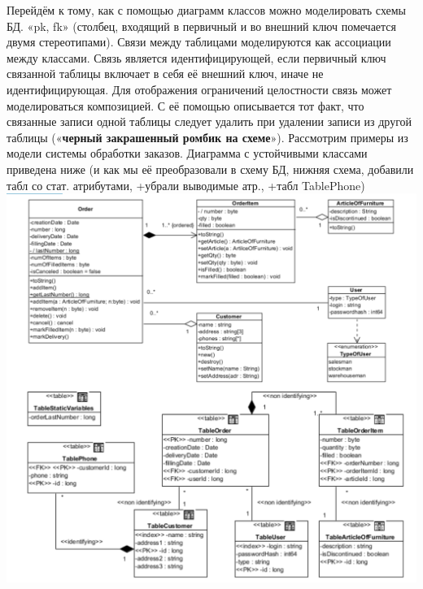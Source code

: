 Перейдём к тому, как с помощью диаграмм классов можно моделировать схемы БД. «pk, fk» (столбец, входящий в первичный и во внешний ключ помечается двумя стереотипами). Связи между таблицами моделируются как ассоциации между классами. Связь является идентифицирующей, если первичный ключ связанной таблицы включает в себя её внешний ключ, иначе не идентифицирующая. Для отображения ограничений целостности связь может моделироваться композицией. С её помощью описывается тот факт, что связанные записи одной таблицы следует удалить при удалении записи из другой таблицы («\textbf{черный закрашенный ромбик на схеме}»). Рассмотрим примеры из модели системы обработки заказов. Диаграмма с устойчивыми классами приведена ниже (и как мы её преобразовали в схему БД, нижняя схема, добавили табл со стат. атрибутами, +убрали выводимые атр., +табл TablePhone)
\includegraphics[scale=0.06]{pics/4_4.png}

